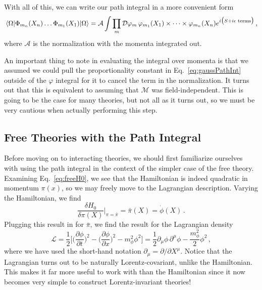 \documentclass{article}
\numberwithin{equation}{subsection}
\begin{document}
With all of this, we can write our path integral in a more convenient form
\begin{equation}\label{eq:pathInt}
    \mel{\Omega}{\Phi_{m_n}(X_n)\dots\Phi_{m_1}(X_1)}{\Omega} = \mathcal{A}\int \prod_m\mathcal{D}\varphi_m\,\varphi_{m_1}(X_1)\times\dots\times\varphi_{m_n}(X_n)e^{i\big(S + i\epsilon\text{ terms}\big)}\,,
\end{equation}
where $\mathcal{A}$ is the normalization with the momenta integrated out.

An important thing to note in evaluating the integral over momenta is that we assumed we could pull the proportionality constant in Eq.~\eqref{eq:gaussPathInt} outside of the $\varphi$ 
integral for it to cancel the term in the normalization. It turns out that this is equivalent to assuming that $\mathcal{M}$ was field-independent. This is going to be the 
case for many theories, but not all as it turns out, so we must be very cautious when actually performing this step.

\subsection{Free Theories with the Path Integral}

Before moving on to interacting theories, we should first familiarize ourselves with using the path integral in the context of the simpler case of the free theory. 
Examining Eq.~\eqref{eq:freeH0}, we see that the Hamiltonian is indeed quadratic in momentum $\pi(x)$, so we may freely move to the Lagrangian description. Varying the Hamiltonian, we find
\begin{equation}
    \frac{\delta H_0}{\delta \pi(X)}\Big|_{\pi = \bar{\pi}} = \bar{\pi}(X) = \dot{\phi}(X)\,.
\end{equation}
Plugging this result in for $\bar{\pi}$, we find the result for the Lagrangian density
\begin{equation}
    \mathcal{L} = \frac{1}{2}\Bigg[\Big(\frac{\partial\phi}{\partial t}\Big)^2 - \Big(\frac{\partial \phi}{\partial x}\Big)^2 - m_\phi^2\phi^2\Bigg] 
	= \frac{1}{2}\partial_\mu \phi\,\partial^\mu \phi - \frac{m_\phi^2}{2}\phi^2\,,
\end{equation}
where we have used the short-hand notation $\partial_\mu = \partial/\partial X^\mu$. Notice that the Lagrangian turns out to be naturally Lorentz-covariant, unlike the Hamiltonian. 
This makes it far more useful to work with than the Hamiltonian since it now becomes very simple to construct Lorentz-invariant theories!
\end{document}
